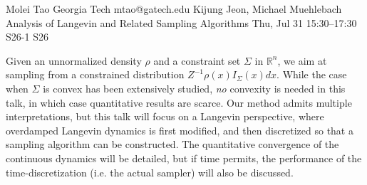\begin{talk}
  {Molei Tao}%
  {Georgia Tech}%
  {mtao@gatech.edu}%
  {Kijung Jeon, Michael Muehlebach}%
  {Analysis of Langevin and Related Sampling Algorithms}%
  {}%
  {Thu, Jul 31 15:30–17:30}%
  {S26-1}%
  {S26}%
				

Given an unnormalized density $\rho$ and a constraint set $\Sigma$ in $\mathbb{R}^n$, we aim at sampling from a constrained distribution $Z^{-1} \rho(x) I_{\Sigma}(x) dx$. While the case when $\Sigma$ is convex has been extensively studied, \emph{no} convexity is needed in this talk, in which case quantitative results are scarce. %
Our method admits multiple interpretations, but this talk will focus on a Langevin perspective, where overdamped Langevin dynamics is first modified, and then discretized so that a sampling algorithm can be constructed. The quantitative convergence of the continuous dynamics will be detailed, but if time permits, the performance of the time-discretization (i.e. the actual sampler) will also be discussed.





\end{talk}

